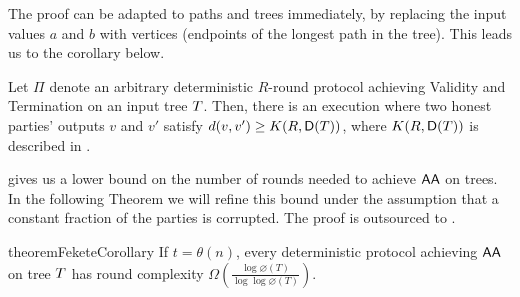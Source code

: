 The proof can be adapted to paths and trees immediately, by replacing the input values $a$ and $b$ with vertices (endpoints of the longest path in the tree). This leads us to the corollary below.
\begin{corollary}\label{corollary:fekete-bound}
 Let $\Pi$ denote an arbitrary deterministic $R$-round protocol achieving Validity and Termination on an input tree $T$. 
 Then, there is an execution where two honest parties' outputs $v$ and $v'$ satisfy $d(v, v') \geq K(R, \textsf{D}(T))$, where $K(R, \textsf{D}(T))$ is described in . 
\end{corollary}

 gives us a lower bound on the number of rounds needed to achieve $\textsf{AA}$ on trees. In the following Theorem we will refine this bound under the assumption that a constant fraction of the parties is corrupted. The proof is outsourced to .

\begin{restatable}{theorem}{FeketeCorollary}\label{thm:fekete-lowerbound-trees}
    If $t = \theta(n)$, every deterministic protocol achieving $\textsf{AA}$ on tree $T$ has round complexity $\Omega\left(\frac{\log \diameter(T)}{\log \log \diameter(T)}\right).$
\end{restatable}